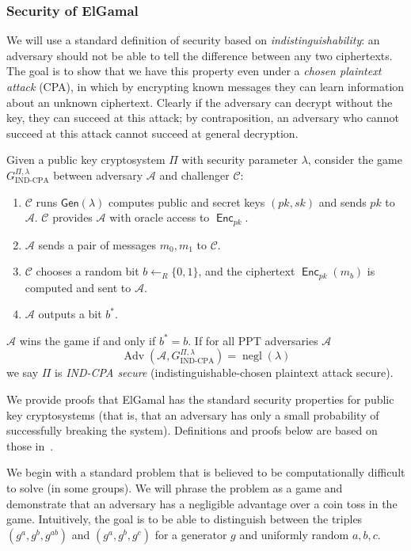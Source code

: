 \documentclass[12pt,a4paper]{article}
\DeclareMathOperator{\negl}{\text{negl}}
\DeclareMathOperator{\Adv}{\text{Adv}}
\DeclareMathOperator{\Enc}{\mathsf{Enc}}
\theoremstyle{definition}
\begin{document}
\subsubsection{Security of ElGamal}
We will use a standard definition of security based on \textit{indistinguishability}: an adversary should not be able to tell the difference between any two ciphertexts. The goal is to show that we have this property even under a \textit{chosen plaintext attack} (CPA), in which by encrypting known messages they can learn information about an unknown ciphertext. Clearly if the adversary can decrypt without the key, they can succeed at this attack; by contraposition, an adversary who cannot succeed at this attack cannot succeed at general decryption.
\begin{definition}
    Given a public key cryptosystem $\Pi$ with security parameter $\lambda$, consider the game $G_{\text{IND-CPA}}^{\Pi,\lambda}$ between adversary $\mathcal{A}$ and challenger $\mathcal{C}$:
    \begin{enumerate}
        \item $\mathcal{C}$ runs $\mathsf{Gen}(\lambda)$ computes public and secret keys $(pk, sk)$ and sends $pk$ to $\mathcal{A}$. $\mathcal{C}$ provides $\mathcal{A}$ with oracle access to $\Enc_{pk}$.
        \item $\mathcal{A}$ sends a pair of messages $m_0, m_1$ to $\mathcal{C}$.
        \item $\mathcal{C}$ chooses a random bit $b\gets_R\{0, 1\}$, and the ciphertext $\Enc_{pk}(m_b)$ is computed and sent to $\mathcal{A}$.
        \item $\mathcal{A}$ outputs a bit $b^*$.
    \end{enumerate}
    $\mathcal{A}$ wins  the game if and only if $b^*=b$. If for all PPT adversaries $\mathcal{A}$
    $$\Adv\left(\mathcal{A},G^{\Pi,\lambda}_{\text{IND-CPA}}\right)=\negl(\lambda)$$
    we say $\Pi$ is \textit{IND-CPA secure} (indistinguishable-chosen plaintext attack secure).
\end{definition}

We provide proofs that ElGamal has the standard security properties for public key cryptosystems (that is, that an adversary has only a small probability of successfully breaking the system). Definitions and proofs below are based on those in~\cite{katz2014introduction}.

We begin with a standard problem that is believed to be computationally difficult to solve (in some groups). We will phrase the problem as a game and demonstrate that an adversary has a negligible advantage over a coin toss in the game. Intuitively, the goal is to be able to distinguish between the triples $(g^a, g^b, g^{ab})$ and $(g^a, g^b, g^c)$ for a generator $g$ and uniformly random $a, b, c$.
\end{document}
